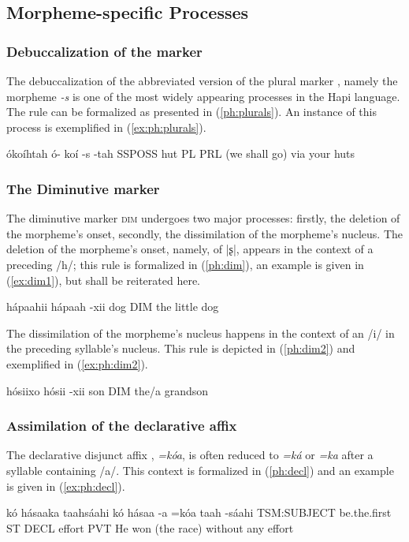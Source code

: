 \documentclass[a4paper, 12pt, oneside]{memoir}
\newcommand{\emh}[1]{\textit{#1}}
\begin{document}
\subsection{Morpheme-specific Processes}\label{morphophonomorphemespecific}
\subsubsection{Debuccalization of the marker \texorpdfstring{\Pl}{PL}}\label{morphophonoplural}
The debuccalization of the abbreviated version of the plural marker \Pl, namely the morpheme \emh{-s} is one of the most widely appearing processes in the Hapi language. The rule can be formalized as presented in (\ref{ph:plurals}). An instance of this process is exemplified in (\ref{ex:ph:plurals}).
\begin{examples}
\ex \label{ph:plurals} 
\ex \label{ex:ph:plurals}
\words ókoíhtah
\bits ó- koí -s -tah
\gloss SSPOSS hut PL PRL
\tr (we shall go) via your huts
\end{examples}
\subsubsection{The Diminutive marker \texorpdfstring{\Dim}{DIM}}\label{morphophonodim}
The diminutive marker \textsc{dim} undergoes two major processes: firstly, the deletion of the morpheme's onset, secondly, the dissimilation of the morpheme's nucleus. The deletion of the morpheme's onset, namely, of |ʂ|, appears in the context of a preceding /h/; this rule is formalized in (\ref{ph:dim}), an example is given in (\ref{ex:dim1}), but shall be reiterated here. 
\begin{examples}
\ex \label{ph:dim} 
\ex \label{ex:ph:dim}
\words hápaahii
\bits hápaah -xii
\gloss dog DIM
\tr the little dog
\end{examples}
The dissimilation of the morpheme's nucleus happens in the context of an /i/ in the preceding syllable's nucleus. This rule is depicted in (\ref{ph:dim2}) and exemplified in (\ref{ex:ph:dim2}).
\begin{examples}
\ex \label{ph:dim2} 
\ex \label{ex:ph:dim2} 
\words hósiixo
\bits hósii -xii
\gloss son DIM 
\tr the/a grandson
\end{examples}
\subsubsection{Assimilation of the declarative affix \texorpdfstring{\Decl}{DECL}}\label{sdeclassim}
The declarative disjunct affix \Decl, \emh{=kóa}, is often reduced to \emh{=ká} or \emh{=ka} after a syllable containing /a/. This context is formalized in (\ref{ph:decl}) and an example is given in (\ref{ex:ph:decl}).
\begin{examples}
\ex \label{ph:decl} 
\ex \label{ex:ph:decl}
\words kó hásaaka taahsáahi
\bits kó hásaa -a =kóa taah -sáahi
\gloss TSM:SUBJECT be.the.first ST DECL effort PVT
\tr He won (the race) without any effort
\end{examples}
\end{document}
